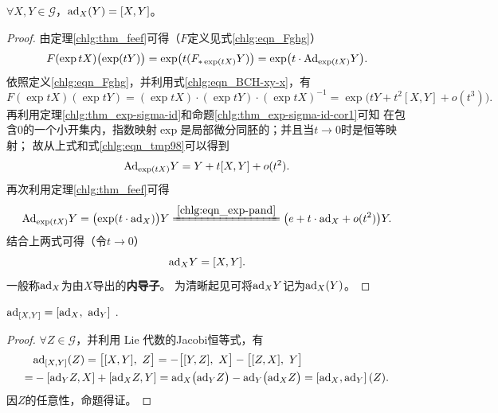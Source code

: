 \begin{theorem}\label{chlg:thm_adxy1}
    $\forall X,Y \in \mathscr{G}$，${\rm ad}_{X}(Y)=[X,Y]$。
\end{theorem}
\begin{proof}
    由定理\ref{chlg:thm_feef}可得（$F$定义见式\eqref{chlg:eqn_Fghg}）
    \begin{equation}\label{chlg:eqn_tmp98}
        F(\exp tX)\bigl(\exp (t Y)\bigr) = \exp \bigl(t (F_{*\exp (tX)} Y)\bigr)
        =\exp \bigl(t \cdot {\rm Ad}_{\exp (tX)} Y\bigr) .
    \end{equation}
    依照定义\eqref{chlg:eqn_Fghg}，并利用式\eqref{chlg:eqn_BCH-xy-x}，有
    \begin{equation*}
        F(\exp tX) (\exp tY) = (\exp tX)\cdot  (\exp tY) \cdot (\exp tX)^{-1}
        =\exp\bigl(tY+t^2[X,Y]+o(t^3)\bigr) .
    \end{equation*}
    再利用定理\ref{chlg:thm_exp-sigma-id}和命题\ref{chlg:thm_exp-sigma-id-cor1}可知
    在包含0的一个小开集内，指数映射$\exp$是局部微分同胚的；并且当$t\to 0$时是恒等映射；
    故从上式和式\eqref{chlg:eqn_tmp98}可以得到
    \begin{equation}
        {\rm Ad}_{\exp (tX)} Y = Y+t[X,Y]+o(t^2).
    \end{equation}
    再次利用定理\ref{chlg:thm_feef}可得
    \begin{equation}
        {\rm Ad}_{\exp (tX)} Y = \bigl(\exp (t\cdot {\rm ad}_X)\bigr) Y
        \xlongequal{\ref{chlg:eqn_exp-pand}}
        \bigl(e + t \cdot {\rm ad}_X + o(t^2)\bigr) Y .
    \end{equation}
    结合上两式可得（令$t\to 0$）
    \begin{equation}
        {\rm ad}_X  Y = [X,Y].
    \end{equation}
    一般称${\rm ad}_X $为由$X$导出的\textbf{内导子}。
    为清晰起见可将${\rm ad}_X  Y$记为${\rm ad}_X  (Y)$。
\end{proof}

\begin{theorem}\label{chlg:thm_adxy2}
    ${\rm ad}_{[X,Y]} = \left[{\rm ad}_X,\  {\rm ad}_Y \right]$ .
\end{theorem}
\begin{proof}
    $\forall Z \in \mathscr{G}$，并利用 Lie 代数的Jacobi恒等式，有
    \begin{align*}
        &{\rm ad}_{[X,Y]}(Z) = \bigl[[X,Y],\ Z\bigr]
        = - \bigl[[Y,Z],\ X\bigr] - \bigl[[Z,X],\ Y\bigr] \\
        =& - \left[{\rm ad}_Y Z, X\right] + \left[{\rm ad}_X Z, Y\right] 
        = {\rm ad}_X\bigl( {\rm ad}_Y Z \bigr) - {\rm ad}_Y\bigl( {\rm ad}_X Z\bigr) 
        = \left[{\rm ad}_X,{\rm ad}_Y \right](Z) .
    \end{align*}
    因$Z$的任意性，命题得证。
\end{proof}

